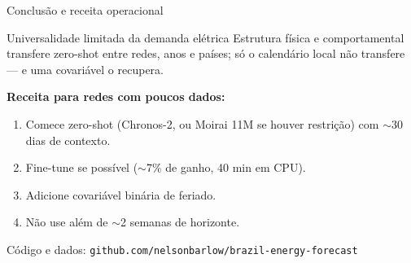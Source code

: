 \documentclass[aspectratio=169,10pt]{beamer}
\begin{document}
\begin{frame}{Conclusão e receita operacional}
  \begin{block}{Universalidade limitada da demanda elétrica}
    Estrutura física e comportamental transfere zero-shot entre redes, anos e países;
    só o calendário local não transfere --- e uma covariável o recupera.
  \end{block}
  \textbf{Receita para redes com poucos dados:}
  \begin{enumerate}
    \item Comece zero-shot (Chronos-2, ou Moirai 11M se houver restrição) com $\sim$30 dias de contexto.
    \item Fine-tune se possível ($\sim$7\% de ganho, 40 min em CPU).
    \item Adicione covariável binária de feriado.
    \item Não use além de $\sim$2 semanas de horizonte.
  \end{enumerate}
  \vspace{0.3em}
  \footnotesize Código e dados: \texttt{github.com/nelsonbarlow/brazil-energy-forecast}
\end{frame}
\end{document}

